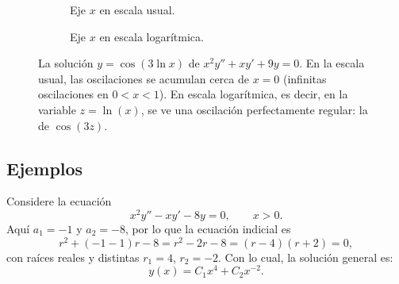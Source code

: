 \begin{figure}[h!]
    \centering
    \begin{subfigure}[b]{0.48\textwidth}
        \centering
        \caption{Eje $x$ en escala usual.}
    \end{subfigure}
    \hfill
    \begin{subfigure}[b]{0.48\textwidth}
        \centering
        \caption{Eje $x$ en escala logar\'itmica.}
    \end{subfigure}
    \caption{La soluci\'on $y=\cos(3\ln x)$ de $x^2y''+xy'+9y=0$. En la escala usual, las oscilaciones se acumulan cerca de $x=0$ (infinitas oscilaciones en $0<x<1$). En escala logar\'itmica, es decir, en la variable $z=\ln(x)$, se ve una oscilaci\'on perfectamente regular: la de $\cos(3z)$.}
    \label{fig:euler_log}
\end{figure}

\subsection*{Ejemplos}

\begin{example}
    Considere la ecuaci\'on
    \[
    x^2y''-xy'-8y=0,\qquad x>0.
    \]
    Aqu\'i $a_1=-1$ y $a_2=-8$, por lo que la ecuaci\'on indicial es
    \[
    r^2+(-1-1)r-8=r^2-2r-8=(r-4)(r+2)=0,
    \]
    con ra\'ices reales y distintas $r_1=4$, $r_2=-2$. Con lo cual, la soluci\'on general es:
    \[
    y(x)=C_1x^4+C_2x^{-2}.
    \]
\end{example}

